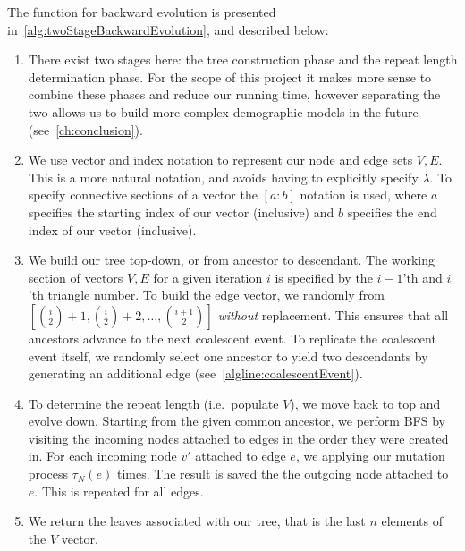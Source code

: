 The function for backward evolution is presented in~\autoref{alg:twoStageBackwardEvolution}, and described below:
\begin{enumerate}
    \item There exist two stages here: the tree construction phase and the repeat length determination phase.
        For the scope of this project it makes more sense to combine these phases and reduce our running time, however
        separating the two allows us to build more complex demographic models in the future
        (see~\autoref{ch:conclusion}).
    \item We use vector and index notation to represent our node and edge sets $V, E$.
        This is a more natural notation, and avoids having to explicitly specify $\lambda$.
        To specify connective sections of a vector the $[a:b]$ notation is used, where $a$ specifies the starting
        index of our vector (inclusive) and $b$ specifies the end index of our vector (inclusive).
    \item We build our tree top-down, or from ancestor to descendant.
        The working section of vectors $V, E$ for a given iteration $i$ is specified by the $i - 1$'th and $i$'th
        triangle number.
        To build the edge vector, we randomly from $\left[\binom{i}{2} + 1, \binom{i}{2} + 2, \ldots,
        \binom{i + 1}{2}\right]$
        \emph{without} replacement.
        This ensures that all ancestors advance to the next coalescent event.
        To replicate the coalescent event itself, we randomly select one ancestor to yield two descendants by generating
        an additional edge (see~\autoref{algline:coalescentEvent}).
    \item To determine the repeat length (i.e.\ populate $V$), we move back to top and evolve down.
        Starting from the given common ancestor, we perform BFS by visiting the incoming nodes attached to edges in
        the order they were created in.
        For each incoming node $v'$ attached to edge $e$, we applying our mutation process $\tau_N(e)$ times.
        The result is saved the the outgoing node attached to $e$.
        This is repeated for all edges.
    \item We return the leaves associated with our tree, that is the last $n$ elements of the $V$ vector.
\end{enumerate}

